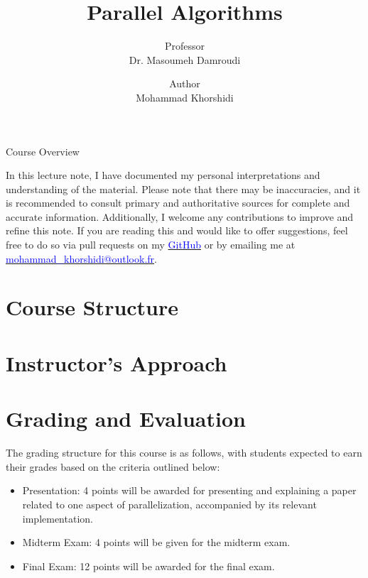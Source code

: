 \documentclass[a4paper, 10pt]{book}
\title{\huge {\bold Parallel Algorithms}}
\author{Professor\\{\bold Dr. Masoumeh Damroudi}}
\date{Author\\{\bold Mohammad Khorshidi}}
\begin{document}
    \maketitle
    \newpage

    \begin{center}
        \Large {\bold Course Overview}
    \end{center}

    In this lecture note, I have documented my personal interpretations and understanding of the material. Please note that there may be inaccuracies, and it is recommended to consult primary and authoritative sources for complete and accurate information. Additionally, I welcome any contributions to improve and refine this note. If you are reading this and would like to offer suggestions, feel free to do so via pull requests on my \href{https://github.com/elprofesorsunny/Master/tree/main/Papers/Parallel%20Aalgorithms/Booklet}{\textcolor{blue}{\bold GitHub}} or by emailing me at \href{mailto:someone@somewhere.com}{\textcolor{blue}{\bold mohammad\_khorshidi@outlook.fr}}.

    \section{Course Structure}

    \section{Instructor's Approach}

    \section{Grading and Evaluation}

        The grading structure for this course is as follows, with students expected to earn their grades based on the criteria outlined below:

        \begin{itemize}
            
            \item {\bold Presentation:} 4 points will be awarded for presenting and explaining a paper related to one aspect of parallelization, accompanied by its relevant implementation.

            \item {\bold Midterm Exam:} 4 points will be given for the midterm exam.

            \item {\bold Final Exam:} 12 points will be awarded for the final exam.

        \end{itemize}
\end{document}
